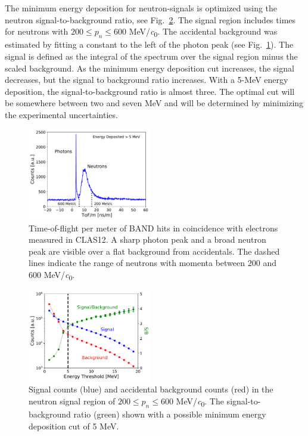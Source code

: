 \documentclass[review,number,sort&compress]{elsarticle}
\begin{document}
The minimum energy deposition for neutron-signals is optimized using the neutron
signal-to-background ratio, see Fig.~\ref{fig:signalbackground}. The
signal region includes times for neutrons with $200\le p_n \le600$
\si{\MeV/\clight}. The accidental background was estimated by
fitting a constant to the left of the photon peak (see
Fig.~\ref{fig:tof}). The signal is defined as the integral of the
spectrum over the signal region minus the scaled background.  
As the minimum energy deposition cut increases, the signal decreases,
but the signal to background ratio increases.  
With a 5-\si{\MeV} energy deposition,
the signal-to-background ratio is almost three. The optimal cut will
be somewhere between two and seven \si{\MeV} and will be determined by
minimizing the experimental uncertainties.
\begin{figure}[tbh!]
	\centering
		\includegraphics[width=0.48\textwidth]{fig23-performance.pdf}
                \caption{Time-of-flight per meter of BAND hits in
                  coincidence with electrons measured in
                  CLAS12. A sharp photon peak and a broad neutron peak are visible
                  over a flat background from accidentals. The dashed
                  lines indicate the range of neutrons with momenta
                  between $200$ and $600$ \si{\MeV/\clight}.}
	\label{fig:tof}
\end{figure}

\begin{figure}[tbh!]
	\centering
		\includegraphics[width=0.48\textwidth]{fig24-spb.pdf}
	\caption{Signal counts (blue) and accidental background counts
          (red) in the neutron signal region of $200 \le p_n \le 600$ \si{\MeV/\clight}. The signal-to-background ratio (green) shown with a possible minimum energy deposition cut of 5 \si{\MeV}.}
	\label{fig:signalbackground}
\end{figure}
\end{document}
